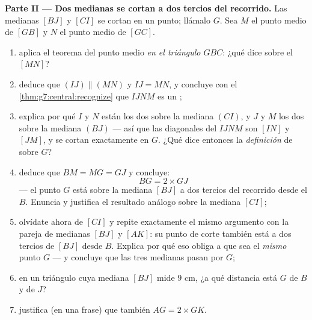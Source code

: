 \begin{problem}
\medskip
\noindent\textbf{Parte II --- Dos medianas se cortan a dos tercios del
recorrido.}
Las medianas $[BJ]$ y $[CI]$ se cortan en un punto; llámalo $G$. Sea
$M$ el punto medio de $[GB]$ y $N$ el punto medio de $[GC]$.
\begin{enumerate}[resume]
  \item aplica el teorema del punto medio \emph{en el triángulo $GBC$}:
        ¿qué dice sobre el  $[MN]$?
  \item deduce que $(IJ) \parallel (MN)$ y $IJ = MN$, y
        concluye con el \cref{thm:g7:central:recognize} que $IJNM$
        es un ;
  \item explica por qué $I$ y $N$ están los dos sobre la mediana $(CI)$,
        y $J$ y $M$ los dos sobre la mediana $(BJ)$ --- así que las
        diagonales del  $IJNM$ son $[IN]$ y
        $[JM]$, y se cortan exactamente en $G$. ¿Qué dice entonces la
        \emph{definición} de  sobre $G$?
  \item deduce que $BM = MG = GJ$ y concluye:
        \[
        BG = 2 \times GJ
        \]
        --- el punto $G$ está sobre la mediana $[BJ]$ a dos tercios
        del recorrido desde el  $B$. Enuncia y justifica el
        resultado análogo sobre la mediana $[CI]$;
  \item olvídate ahora de $[CI]$ y repite exactamente el mismo argumento con la
        pareja de medianas $[BJ]$ y $[AK]$: su punto de corte
        también está a dos tercios de $[BJ]$ desde $B$. Explica por qué
        eso obliga a que sea el \emph{mismo} punto $G$ --- y
        concluye que las tres medianas pasan por $G$;
  \item en un triángulo cuya mediana $[BJ]$ mide $9$ cm,
        ¿a qué distancia está $G$ de $B$ y de $J$?
  \item justifica (en una frase) que también $AG = 2 \times GK$.
\end{enumerate}


\end{problem}
